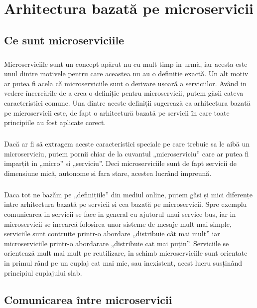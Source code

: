 \documentclass[12pt]{report}
\begin{document}
\chapter{Arhitectura bazată pe microservicii}
	\section{Ce sunt microserviciile}
	\paragraph{}Microserviciile sunt un concept apărut nu cu mult timp in urmă, iar acesta este unul dintre motivele pentru care aceastea nu au o definiție exactă. Un alt motiv ar putea fi acela că microserviciile sunt o derivare ușoară a serviciilor. Având in vedere încercările de a crea o definiție pentru microservicii, putem găsii cateva caracteristici comune. Una dintre aceste definiții sugerează ca arhitectura bazată pe microservicii este, de fapt o arhitectură bazată pe servicii în care toate principiile au fost aplicate corect.
	\paragraph{}Dacă ar fi să extragem aceste caracteristici speciale pe care trebuie sa le aibă un microserviciu, putem pornii chiar de la cuvantul „microserviciu” care ar putea fi imparțit in „micro” si „serviciu”. Deci microserviciile sunt de fapt servicii de dimensiune mică, autonome si fara stare, acestea lucrând impreună. 
	\paragraph{}Daca tot ne bazăm pe „definițiile” din mediul online, putem găsi și mici diferențe intre arhitectura bazată pe servicii si cea bazată pe microservicii. Spre exemplu comunicarea in servicii se face in general cu ajutorul unui service bus, iar in microservicii se incearcă folosirea unor sisteme de mesaje mult mai simple, serviciile sunt contruite printr-o abordare „distribuie cât mai mult” iar microserviciile printr-o abordarare „distribuie cat mai puțin”. Serviciile se orientează mult mai mult pe reutilizare, în schimb microserviciile sunt orientate in primul rând pe un cuplaj cat mai mic, sau inexistent, acest lucru susținând principiul cuplajului slab.
	\section{Comunicarea între microservicii}
\end{document}
